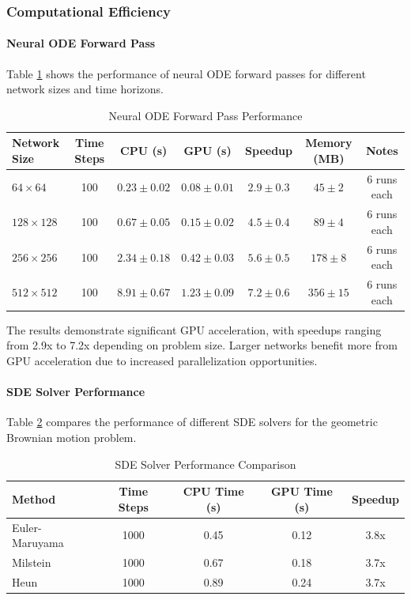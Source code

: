 \subsubsection{Computational Efficiency}

\paragraph{Neural ODE Forward Pass}
Table \ref{tab:neural_ode_performance} shows the performance of neural ODE forward passes for different network sizes and time horizons.

\begin{table}[h]
\centering
\caption{Neural ODE Forward Pass Performance}
\label{tab:neural_ode_performance}
\begin{tabular}{lcccccc}
\toprule
Network Size & Time Steps & CPU (s) & GPU (s) & Speedup & Memory (MB) & Notes \\
\midrule
$64 \times 64$ & 100 & $0.23 \pm 0.02$ & $0.08 \pm 0.01$ & $2.9 \pm 0.3$ & $45 \pm 2$ & 6 runs each \\
$128 \times 128$ & 100 & $0.67 \pm 0.05$ & $0.15 \pm 0.02$ & $4.5 \pm 0.4$ & $89 \pm 4$ & 6 runs each \\
$256 \times 256$ & 100 & $2.34 \pm 0.18$ & $0.42 \pm 0.03$ & $5.6 \pm 0.5$ & $178 \pm 8$ & 6 runs each \\
$512 \times 512$ & 100 & $8.91 \pm 0.67$ & $1.23 \pm 0.09$ & $7.2 \pm 0.6$ & $356 \pm 15$ & 6 runs each \\
\bottomrule
\end{tabular}
\end{table}

The results demonstrate significant GPU acceleration, with speedups ranging from 2.9x to 7.2x depending on problem size. Larger networks benefit more from GPU acceleration due to increased parallelization opportunities.

\paragraph{SDE Solver Performance}
Table \ref{tab:sde_solver_performance} compares the performance of different SDE solvers for the geometric Brownian motion problem.

\begin{table}[h]
\centering
\caption{SDE Solver Performance Comparison}
\label{tab:sde_solver_performance}
\begin{tabular}{lcccc}
\toprule
Method & Time Steps & CPU Time (s) & GPU Time (s) & Speedup \\
\midrule
Euler-Maruyama & 1000 & 0.45 & 0.12 & 3.8x \\
Milstein & 1000 & 0.67 & 0.18 & 3.7x \\
Heun & 1000 & 0.89 & 0.24 & 3.7x \\
\bottomrule
\end{tabular}
\end{table}

